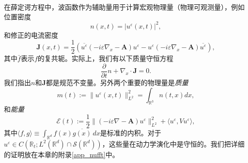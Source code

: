 在薛定谔方程中，波函数作为辅助量用于计算宏观物理量（物理可观测量），例如位置密度
\begin{equation}
n(x,t)=|u^{\varepsilon}(x,t)|^{2},
\end{equation}
和修正的电流密度
\begin{equation}
\mathbf{J}(x,t)=\frac{1}{2}\left(\overline{u^{\varepsilon}}\left(-i\varepsilon\nabla_{x}-{\mathbf A}\right)u^{\varepsilon}-
u^{\varepsilon}\left(-i\varepsilon\nabla_{x}-{\mathbf A}\right)\overline{u^{\varepsilon}}\right),
\end{equation}
其中$\bar{f}$表示$f$的复共轭。实际上，我们有以下质量守恒方程
\begin{equation}
\frac{\partial}{\partial t}n+\nabla_{x}\cdot\mathbf{J}=0.
\end{equation}
我们指出$n$和$\mathbf{J}$都是规范不变量。另外两个重要的物理量是{\it 质量}
\begin{equation}
m(t):=\|u^{\varepsilon}(x,t)\|^2_{L^2}=\int_{\mathbb R^3} n(t,x) dx,
\end{equation}
和{\it 能量}
\begin{equation}
\mathcal E(t):=\frac{1}{2}\|(-i\varepsilon\nabla-\mathbf{A})u^{\varepsilon}\|_{L^2}^2+\langle u^{\varepsilon},Vu^{\varepsilon}\rangle,
\end{equation}
其中$\langle f,g\rangle \equiv\int_{\mathbb{R}^d}f(x)\overline{ g(x)}\,dx$是标准的内积。对于$u^\varepsilon \in C(\mathbb{R}_t;L^2(\mathbb{R}^d) \cap \mathcal S (\mathbb R^d))$，这些量在动力学演化中是守恒的。我们把详细的证明放在本章的附录\ref{app_nufft}中。


